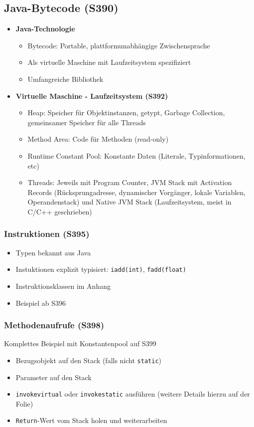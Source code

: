 \subsection{Java-Bytecode (S390)}
\begin{itemize}
	\item \textbf{Java-Technologie}
	\begin{itemize}
		\item Bytecode: Portable, plattformunabhängige Zwischensprache
		\item Als virtuelle Maschine mit Laufzeitsystem spezifiziert
		\item Umfangreiche Bibliothek
	\end{itemize}
	\item \textbf{Virtuelle Maschine - Laufzeitsystem (S392)}
	\begin{itemize}
		\item Heap: Speicher für Objektinstanzen, getypt, Garbage Collection, gemeinsamer Speicher für alle Threads
		\item Method Area: Code für Methoden (read-only)
		\item Runtime Constant Pool: Konstante Daten (Literale, Typinformationen, etc)
		\item Threads: Jeweils mit Program Counter, JVM Stack mit Activation Records (Rücksprungadresse, dynamischer Vorgänger, lokale Variablen, Operandenstack) und Native JVM Stack (Laufzeitsystem, meist in C/C++ geschrieben) 
	\end{itemize}
\end{itemize}

\subsubsection{Instruktionen (S395)}
\begin{itemize}
	\item Typen bekannt aus Java
	\item Instuktionen explizit typisiert: \texttt{iadd(int)}, \texttt{fadd(float)}
	\item Instruktionsklassen im Anhang
	\item Beispiel ab S396
\end{itemize}

\subsubsection{Methodenaufrufe (S398)}
Komplettes Beispiel mit Konstantenpool auf S399
\begin{itemize}
	\item Bezugsobjekt auf den Stack (falls nicht \texttt{static})
	\item Parameter auf den Stack
	\item \texttt{invokevirtual} oder \texttt{invokestatic} ausführen (weitere Details hierzu auf der Folie)
	\item \texttt{Return}-Wert vom Stack holen und weiterarbeiten
\end{itemize}


